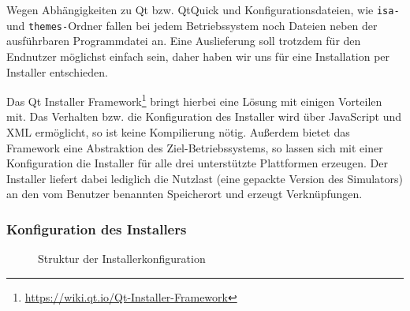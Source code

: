 Wegen Abhängigkeiten zu Qt bzw. QtQuick und Konfigurationsdateien, wie
\texttt{isa-} und \texttt{themes-}Ordner fallen bei jedem Betriebssystem noch
Dateien neben der ausführbaren Programmdatei an. Eine Auslieferung soll trotzdem
für den Endnutzer möglichst einfach sein, daher haben wir uns für eine
Installation per Installer entschieden.

Das Qt Installer
Framework\footnote{\url{https://wiki.qt.io/Qt-Installer-Framework}} bringt
hierbei eine Lösung mit einigen Vorteilen mit. Das Verhalten bzw. die
Konfiguration des Installer wird über JavaScript und XML ermöglicht, so ist
keine Kompilierung nötig. Außerdem bietet das Framework eine Abstraktion des
Ziel-Betriebssystems, so lassen sich mit einer Konfiguration die Installer für
alle drei unterstützte Plattformen erzeugen. Der Installer liefert dabei
lediglich die Nutzlast (eine gepackte Version des Simulators) an den vom
Benutzer benannten Speicherort und erzeugt Verknüpfungen.

\subsubsection{Konfiguration des Installers}
\begin{figure}[H]
	\begin{center}
	\end{center}
	\caption{Struktur der Installerkonfiguration}
	\label{dev-manual-installer}
  \vspace{-0.4cm}
\end{figure}

